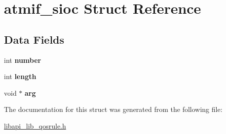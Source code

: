 \hypertarget{structatmif__sioc}{}\section{atmif\+\_\+sioc Struct Reference}
\label{structatmif__sioc}
\subsection*{Data Fields}
\begin{DoxyCompactItemize}
\item 
\mbox{\label{structatmif__sioc_a68ccebeb5b8a6242719d4b8320a2a56d}} 
int {\bfseries number}
\item 
\mbox{\label{structatmif__sioc_a93a56cc9801cfd555164092b03ae577b}} 
int {\bfseries length}
\item 
\mbox{\label{structatmif__sioc_a9c2af59956d5eb8de060fe3661713a85}} 
void $\ast$ {\bfseries arg}
\end{DoxyCompactItemize}


The documentation for this struct was generated from the following file\+:\begin{DoxyCompactItemize}
\item 
\hyperlink{libapi__lib__qosrule_8h}{libapi\+\_\+lib\+\_\+qosrule.\+h}\end{DoxyCompactItemize}
